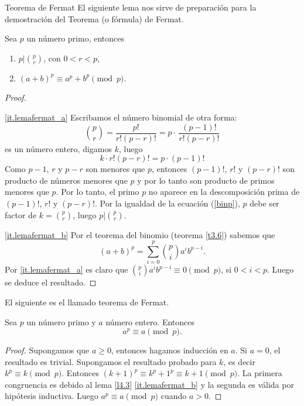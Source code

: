 \begin{section}{Teorema de Fermat}\label{seccion-teorema-de-fermat} 
El siguiente lema nos sirve de preparación para la demostración
del Teorema (o fórmula) de Fermat.

\begin{lema} \label{l4.3} Sea $p$ un número primo, entonces
\begin{enumerate}[label=\textit{\alph*)}]
\item\label{it.lemafermat_a}  $p|\binom{p}{r}$, con $0< r <p$,
\item\label{it.lemafermat_b}  $(a+b)^p \equiv a^p+b^p \pmod{p}$.
\end{enumerate}
\end{lema}
\begin{proof}
    \
    
    \ref{it.lemafermat_a} Escribamos el número binomial de otra forma: 
$$
\binom{p}{r}=\frac{p!}{r!(p-r)!}=p\cdot\,\frac{(p-1)!}{r!(p-r)!}
$$ 
es un número entero, digamos $k$, luego 
\begin{equation}\label{binp}
k \cdot r!(p-r)! = p \cdot(p-1)!
\end{equation}
Como $p-1$, $r$ y $p-r$ son menores que $p$, entonces  $(p-1)!$, $r!$ y $(p-r)!$ son producto de números menores que $p$ y por lo tanto son producto de primos menores que $p$. 
Por lo tanto, el primo $p$ no aparece en la descomposición prima de $(p-1)!$, $r!$ y $(p-r)!$. Por la igualdad de la ecuación (\ref{binp}), $p$ debe ser factor de $k = \binom{p}{r}$, luego $p|\binom{p}{r}$.

\ref{it.lemafermat_b} Por el teorema del binomio (teorema \ref{t3.6}) sabemos que
$$
(a+b)^p =\sum_{i=0}^{p} \binom{p}{i} a^ib^{p-i}.
$$
Por \ref{it.lemafermat_a} es claro que $ \binom{p}{i} a^ib^{p-i}\equiv 0 \pmod{p}$,
si $0<i<p$. Luego se deduce el resultado.
\end{proof}

El siguiente es el llamado teorema de Fermat.

\begin{teorema}\label{t4.3} Sea $p$ un número primo y $a$ número
entero. Entonces
$$
a^p\equiv a\pmod{p}.
$$
\end{teorema}
\begin{proof} Supongamos que $a\ge 0$, entonces hagamos
inducción en $a$. Si $a=0$, el resultado es trivial. Supongamos el
resultado probado para $k$, es decir $k^p \equiv k \pmod{p}$.
Entonces $(k+1)^p \equiv k^p +1^p \equiv k+1 \pmod{p}$. La primera
congruencia es debido al lema \ref{l4.3} \ref{it.lemafermat_b} y la segunda es
válida por hipótesis inductiva. Luego $a^p\equiv a\pmod{p}$ cuando $a >0$.


\end{proof}
\end{section}
